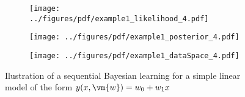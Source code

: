 \begin{figure}[H]
\begin{subfigure}[c]{0.32\textwidth}
\texttt{[image: ../figures/pdf/example1\_likelihood\_4.pdf]} 
\end{subfigure}
\begin{subfigure}[c]{0.32\textwidth}
\texttt{[image: ../figures/pdf/example1\_posterior\_4.pdf]} 
\end{subfigure}
\begin{subfigure}[c]{0.32\textwidth}
\texttt{[image: ../figures/pdf/example1\_dataSpace\_4.pdf]} 
\end{subfigure}
\caption{Ilustration of a sequential Bayesian learning for a simple linear model of the form $y(x,\vm{w})= w_0 + w_1 x$}
\end{figure}










